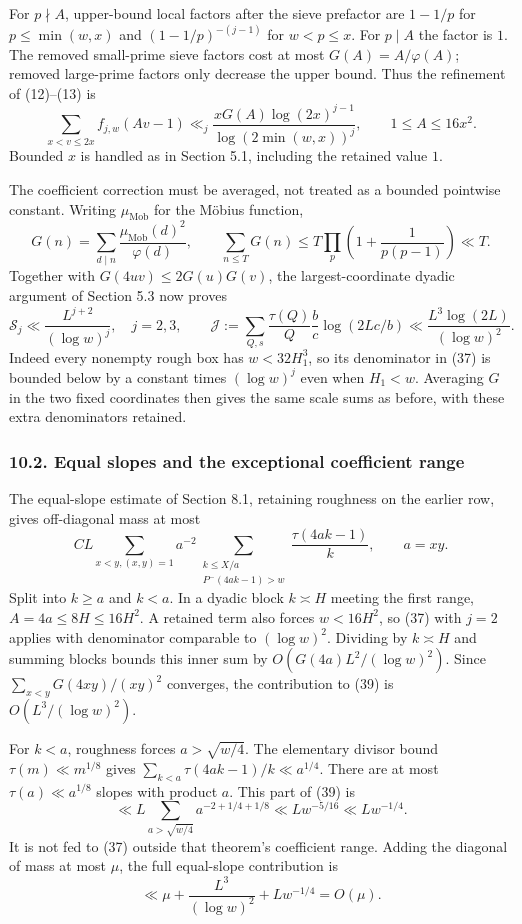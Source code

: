 \documentclass[
  english,
  11pt,
]{article}
\begin{document}
For \(p\nmid A\), upper-bound local factors after the sieve prefactor
are \(1-1/p\) for \(p\le\min(w,x)\) and \((1-1/p)^{-(j-1)}\) for
\(w<p\le x\). For \(p\mid A\) the factor is \(1\). The removed
small-prime sieve factors cost at most \(G(A)=A/\varphi(A)\); removed
large-prime factors only decrease the upper bound. Thus the refinement
of (12)--(13) is \[
\sum_{x<v\le2x}f_{j,w}(Av-1)
\ll_j\frac{xG(A)\log(2x)^{j-1}}{\log(2\min(w,x))^j},
\qquad 1\le A\le16x^2. \tag{37}
\] Bounded \(x\) is handled as in Section 5.1, including the retained
value \(1\).

The coefficient correction must be averaged, not treated as a bounded
pointwise constant. Writing \(\mu_{\mathrm{Mob}}\) for the Möbius
function, \[
G(n)=\sum_{d\mid n}\frac{\mu_{\mathrm{Mob}}(d)^2}{\varphi(d)},\qquad
\sum_{n\le T}G(n)\le T\prod_p\left(1+\frac1{p(p-1)}\right)\ll T.
\] Together with \(G(4uv)\le2G(u)G(v)\), the largest-coordinate dyadic
argument of Section 5.3 now proves \[
\mathcal S_j\ll\frac{L^{j+2}}{(\log w)^j},\quad j=2,3,
\qquad
\mathcal J:=\sum_{Q,s}\frac{\tau(Q)}Q\frac bc\log(2Lc/b)
\ll\frac{L^3\log(2L)}{(\log w)^2}. \tag{38}
\] Indeed every nonempty rough box has \(w<32H_1^3\), so its denominator
in (37) is bounded below by a constant times \((\log w)^j\) even when
\(H_1<w\). Averaging \(G\) in the two fixed coordinates then gives the
same scale sums as before, with these extra denominators retained.

\subsubsection{10.2. Equal slopes and the exceptional coefficient
range}\label{equal-slopes-and-the-exceptional-coefficient-range}

The equal-slope estimate of Section 8.1, retaining roughness on the
earlier row, gives off-diagonal mass at most \[
CL\sum_{x<y,(x,y)=1}a^{-2}
\sum_{\substack{k\le X/a\\P^-(4ak-1)>w}}\frac{\tau(4ak-1)}k,
\qquad a=xy. \tag{39}
\] Split into \(k\ge a\) and \(k<a\). In a dyadic block \(k\asymp H\)
meeting the first range, \(A=4a\le8H\le16H^2\). A retained term also
forces \(w<16H^2\), so (37) with \(j=2\) applies with denominator
comparable to \((\log w)^2\). Dividing by \(k\asymp H\) and summing
blocks bounds this inner sum by \(O(G(4a)L^2/(\log w)^2)\). Since
\(\sum_{x<y}G(4xy)/(xy)^2\) converges, the contribution to (39) is
\(O(L^3/(\log w)^2)\).

For \(k<a\), roughness forces \(a>\sqrt{w/4}\). The elementary divisor
bound \(\tau(m)\ll m^{1/8}\) gives
\(\sum_{k<a}\tau(4ak-1)/k\ll a^{1/4}\). There are at most
\(\tau(a)\ll a^{1/8}\) slopes with product \(a\). This part of (39) is
\[
\ll L\sum_{a>\sqrt{w/4}}a^{-2+1/4+1/8}
\ll Lw^{-5/16}\ll Lw^{-1/4}.
\] It is not fed to (37) outside that theorem's coefficient range.
Adding the diagonal of mass at most \(\mu\), the full equal-slope
contribution is \[
\ll\mu+\frac{L^3}{(\log w)^2}+Lw^{-1/4}=O(\mu). \tag{40}
\]
\end{document}
